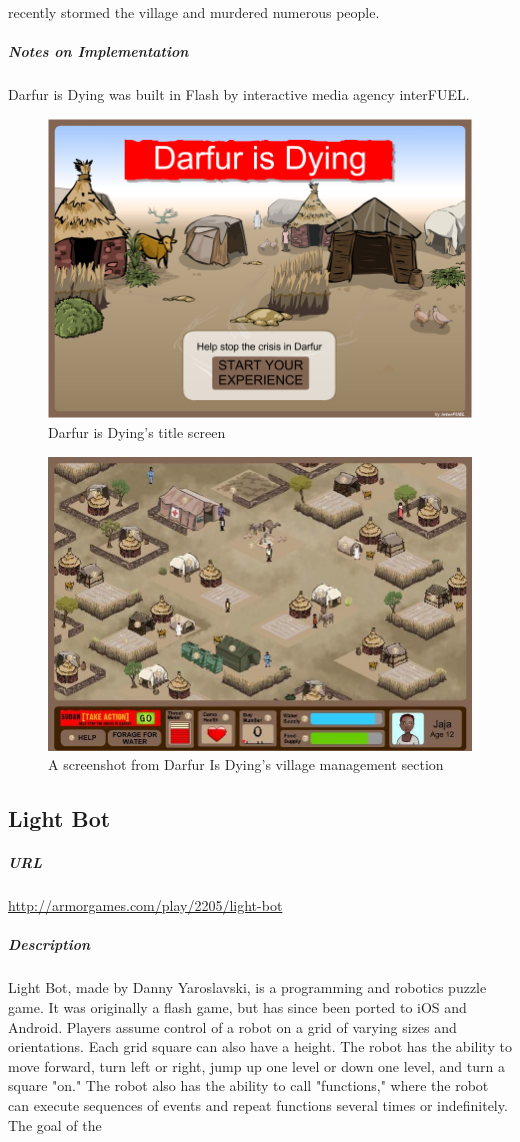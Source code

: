 recently stormed the village and murdered numerous people.\subparagraph{Notes on Implementation}Darfur is Dying was built in Flash by interactive media agency interFUEL.\begin{figure}[p]\centering \includegraphics[height=.4\textheight, width=\textwidth, keepaspectratio=true]{img/darfur_title.png}\caption{Darfur is Dying's title screen}\end{figure}\begin{figure}[p]\centering \includegraphics[height=.4\textheight, width=\textwidth, keepaspectratio=true]{img/darfur_screen1.jpg}\caption{A screenshot from Darfur Is Dying's village management section}\end{figure}\subsection{Light Bot}\subparagraph{URL}\url{http://armorgames.com/play/2205/light-bot}\subparagraph{Description}Light Bot, made by Danny Yaroslavski, is a programming and robotics puzzle game. It was originally a flash game, but has since been ported to iOS and Android. Players assume control of a robot on a grid of varying sizes and orientations. Each grid square can also have a height. The robot has the ability to move forward, turn left or right, jump up one level or down one level, and turn a square "on." The robot also has the ability to call "functions," where the robot can execute sequences of events and repeat functions several times or indefinitely. The goal of the 